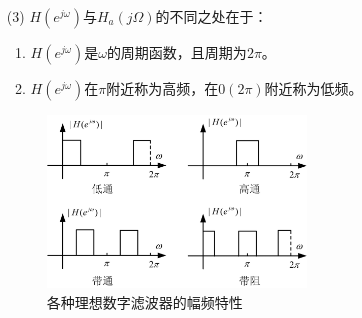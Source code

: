 \documentclass[notheorems,compress,mathserif,table]{beamer}
\begin{document}
\begin{frame}\frametitle{}%
\begin{enumerate}
\item [(3)] $H(e^{j\omega})$与$H_a(j\Omega)$的不同之处在于：
  \begin{enumerate}
    \item $H(e^{j\omega})$是$\omega$的周期函数，且周期为$2\pi$。
    \item $H(e^{j\omega})$在$\pi$附近称为高频，在$0(2\pi)$附近称为低频。
  \end{enumerate}

  \begin{figure}[h]
    \centering
    \includegraphics[width=0.65\textwidth]{fig10_shuzilvboqi.jpg}
    \caption{各种理想数字滤波器的幅频特性}
   \end{figure}
   \end{enumerate}
\end{frame}
\end{document}
